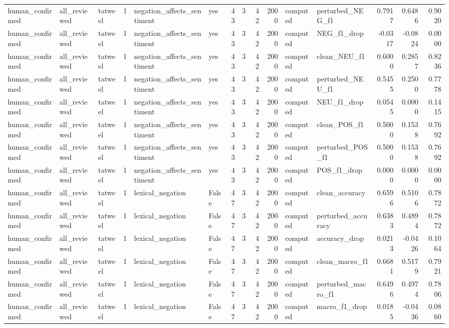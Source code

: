 \begin{tabular}{lllrllrrrrllrrr}
human_confirmed & all_reviewed & tatweel & 1 & negation_affects_sentiment & yes & 43 & 3 & 42 & 2000 & computed & perturbed_NEG_f1 & 0.7917 & 0.6486 & 0.9020 \\
human_confirmed & all_reviewed & tatweel & 1 & negation_affects_sentiment & yes & 43 & 3 & 42 & 2000 & computed & NEG_f1_drop & -0.0317 & -0.0824 & 0.0000 \\
human_confirmed & all_reviewed & tatweel & 1 & negation_affects_sentiment & yes & 43 & 3 & 42 & 2000 & computed & clean_NEU_f1 & 0.6000 & 0.2857 & 0.8236 \\
human_confirmed & all_reviewed & tatweel & 1 & negation_affects_sentiment & yes & 43 & 3 & 42 & 2000 & computed & perturbed_NEU_f1 & 0.5455 & 0.2500 & 0.7778 \\
human_confirmed & all_reviewed & tatweel & 1 & negation_affects_sentiment & yes & 43 & 3 & 42 & 2000 & computed & NEU_f1_drop & 0.0545 & 0.0000 & 0.1415 \\
human_confirmed & all_reviewed & tatweel & 1 & negation_affects_sentiment & yes & 43 & 3 & 42 & 2000 & computed & clean_POS_f1 & 0.5000 & 0.1538 & 0.7692 \\
human_confirmed & all_reviewed & tatweel & 1 & negation_affects_sentiment & yes & 43 & 3 & 42 & 2000 & computed & perturbed_POS_f1 & 0.5000 & 0.1538 & 0.7692 \\
human_confirmed & all_reviewed & tatweel & 1 & negation_affects_sentiment & yes & 43 & 3 & 42 & 2000 & computed & POS_f1_drop & 0.0000 & 0.0000 & 0.0000 \\
human_confirmed & all_reviewed & tatweel & 1 & lexical_negation & False & 47 & 3 & 42 & 2000 & computed & clean_accuracy & 0.6596 & 0.5106 & 0.7872 \\
human_confirmed & all_reviewed & tatweel & 1 & lexical_negation & False & 47 & 3 & 42 & 2000 & computed & perturbed_accuracy & 0.6383 & 0.4894 & 0.7872 \\
human_confirmed & all_reviewed & tatweel & 1 & lexical_negation & False & 47 & 3 & 42 & 2000 & computed & accuracy_drop & 0.0213 & -0.0426 & 0.1064 \\
human_confirmed & all_reviewed & tatweel & 1 & lexical_negation & False & 47 & 3 & 42 & 2000 & computed & clean_macro_f1 & 0.6681 & 0.5179 & 0.7921 \\
human_confirmed & all_reviewed & tatweel & 1 & lexical_negation & False & 47 & 3 & 42 & 2000 & computed & perturbed_macro_f1 & 0.6496 & 0.4974 & 0.7806 \\
human_confirmed & all_reviewed & tatweel & 1 & lexical_negation & False & 47 & 3 & 42 & 2000 & computed & macro_f1_drop & 0.0185 & -0.0436 & 0.0860 \\

\end{tabular}

